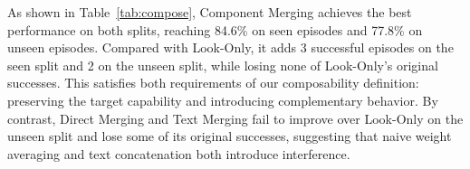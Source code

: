 \documentclass{llmxive}
\begin{document}
As shown in Table~\ref{tab:compose}, Component Merging achieves the best performance on both splits, reaching 84.6\% on seen episodes and 77.8\% on unseen episodes. Compared with Look-Only, it adds 3 successful episodes on the seen split and 2 on the unseen split, while losing none of Look-Only's original successes. This satisfies both requirements of our composability definition: preserving the target capability and introducing complementary behavior. By contrast, Direct Merging and Text Merging fail to improve over Look-Only on the unseen split and lose some of its original successes, suggesting that naive weight averaging and text concatenation both introduce interference.
\end{document}
